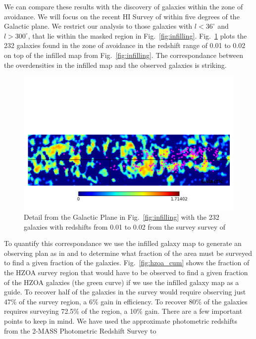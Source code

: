 \documentclass[useAMS,usenatbib]{mn2e}
\begin{document}
We can compare these results with the discovery of galaxies within the
zone of avoidance.  We will focus on the recent HI Survey of
\citet{2016AJ....151...52S} within five degrees of the Galactic plane.  We
restrict our analysis to those galaxies with $l<36^\circ$ and $l>300^\circ$, that
lie within the masked region in Fig.~\ref{fig:infilling}.
Fig.~\ref{fig:hzoa_map} plots the
232 galaxies found in the zone of avoidance in the redshift range of
0.01 to 0.02 on top of the infilled map from Fig.~\ref{fig:infilling}.
The correspondance between the overdensities in the infilled map and
the observed galaxies is striking.
\begin{figure}
  \includegraphics[width=\columnwidth,clip,trim=0 1in 0 0]{hzoa_inf_cut}
  \caption{Detail from the Galactic Plane in Fig.~\ref{fig:infilling}
    with the 232 galaxies with redshifts from 0.01 to 0.02 from the survey
    survey of \citet{2016AJ....151...52S}}
  \label{fig:hzoa_map}
\end{figure}
To quantify this correspondance we use the infilled galaxy map to
generate an observing plan as in \citet{2016MNRAS.462.1085A} and to
determine what fraction of the area must be surveyed to find a given
fraction of the galaxies.  Fig.~\ref{fig:hzoa_cum} shows the fraction
of the HZOA survey region that would have to be observed to find a
given fraction of the HZOA galaxies (the green curve) if we use the
infilled galaxy map as a guide.  To recover half of the galaxies in
the survey would require observing just 47\% of the survey region, a
6\% gain in efficiency.  To recover 80\% of the galaxies requires
surveying 72.5\% of the region, a 10\% gain.  There are a few
important points to keep in mind.  We have used the approximate
photometric redshifts from the 2-MASS Photometric Redshift Survey to
\end{document}

